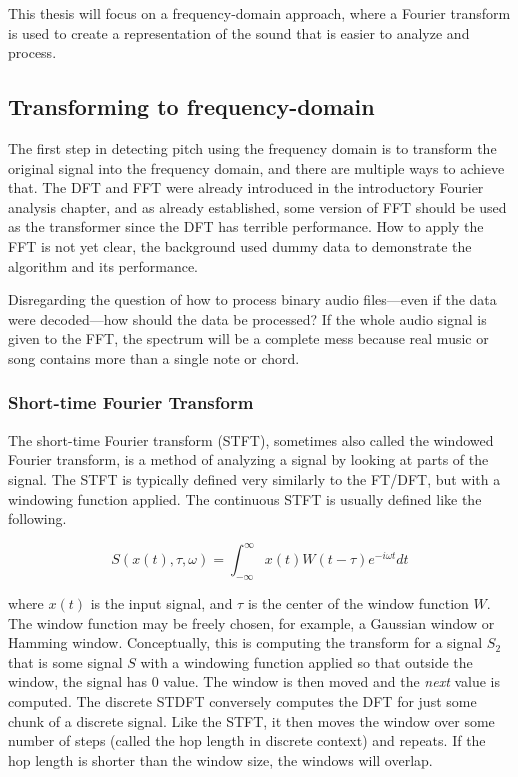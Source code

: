 This thesis will focus on a frequency-domain approach, where a Fourier transform is used to create a representation of the sound that is easier to analyze and process.

\subsection{Transforming to frequency-domain}
The first step in detecting pitch using the frequency domain is to transform the original signal into the frequency domain, and there are multiple ways to achieve that. The DFT and FFT were already introduced in the introductory Fourier analysis chapter, and as already established, some version of FFT should be used as the transformer since the DFT has terrible performance. How to apply the FFT is not yet clear, the background used dummy data to demonstrate the algorithm and its performance. 

Disregarding the question of how to process binary audio files—even if the data were decoded—how should the data be processed? If the whole audio signal is given to the FFT, the spectrum will be a complete mess because real music or song contains more than a single note or chord.

\subsubsection{Short-time Fourier Transform}
The short-time Fourier transform (STFT), sometimes also called the windowed Fourier transform, is a method of analyzing a signal by looking at parts of the signal. The STFT is typically defined very similarly to the FT/DFT, but with a windowing function applied. The continuous STFT is usually defined like the following.

$$S(x(t), \tau, \omega ) = \int_{-\infty}^{\infty} x(t)W(t-\tau)e^{-i\omega t}dt$$

where $x(t)$ is the input signal, and $\tau$ is the center of the window function $W$. The window function may be freely chosen, for example, a Gaussian window or Hamming window. Conceptually, this is computing the transform for a signal $S_2$ that is some signal $S$ with a windowing function applied so that outside the window, the signal has 0 value. The window is then moved and the \textit{next} value is computed. The discrete STDFT conversely computes the DFT for just some chunk of a discrete signal. Like the STFT, it then moves the window over some number of steps (called the hop length in discrete context) and repeats. If the hop length is shorter than the window size, the windows will overlap.


